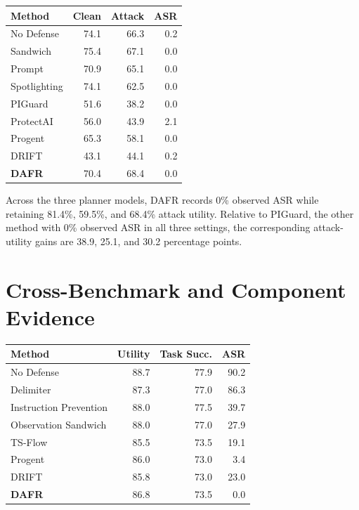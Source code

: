\documentclass[letterpaper]{article}
\begin{document}
\begin{center}
\small
\begin{tabular}{lrrr}
\toprule
Method & Clean & Attack & ASR\\
\midrule
No Defense & 74.1 & 66.3 & 0.2\\
Sandwich & 75.4 & 67.1 & 0.0\\
Prompt & 70.9 & 65.1 & 0.0\\
Spotlighting & 74.1 & 62.5 & 0.0\\
PIGuard & 51.6 & 38.2 & 0.0\\
ProtectAI & 56.0 & 43.9 & 2.1\\
Progent & 65.3 & 58.1 & 0.0\\
DRIFT & 43.1 & 44.1 & 0.2\\
\textbf{DAFR} & 70.4 & 68.4 & 0.0\\
\bottomrule
\end{tabular}
\label{tab:claude-full}
\end{center}

Across the three planner models, DAFR records 0\% observed ASR while retaining 81.4\%, 59.5\%, and 68.4\% attack utility. Relative to PIGuard, the other method with 0\% observed ASR in all three settings, the corresponding attack-utility gains are 38.9, 25.1, and 30.2 percentage points.

\section{Cross-Benchmark and Component Evidence}

\begin{center}
\small
\begin{tabular}{lrrr}
\toprule
Method & Utility & Task Succ. & ASR\\
\midrule
No Defense & 88.7 & 77.9 & 90.2\\
Delimiter & 87.3 & 77.0 & 86.3\\
Instruction Prevention & 88.0 & 77.5 & 39.7\\
Observation Sandwich & 88.0 & 77.0 & 27.9\\
TS-Flow & 85.5 & 73.5 & 19.1\\
Progent & 86.0 & 73.0 & 3.4\\
DRIFT & 85.8 & 73.0 & 23.0\\
\textbf{DAFR} & 86.8 & 73.5 & 0.0\\
\bottomrule
\end{tabular}
\label{tab:asb-full}
\end{center}
\end{document}
